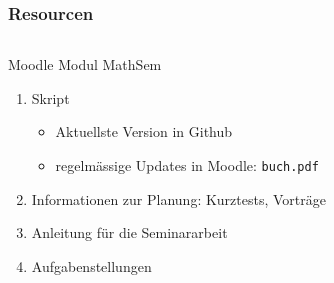 %
%
%
\begin{frame}[t]
\frametitle{Resourcen}
\begin{columns}[t,onlytextwidth]
\begin{column}{0.48\textwidth}
\begin{block}{Moodle Modul MathSem}
\begin{enumerate}
\item<2-> Skript
\begin{itemize}
\item<3-> Aktuellste Version in Github
\item<4-> regelmässige Updates in Moodle: \texttt{buch.pdf}
\end{itemize}
\item<5-> Informationen zur Planung: Kurztests, Vorträge
\item<6-> Anleitung für die Seminararbeit
\item<7-> Aufgabenstellungen
\end{enumerate}
\end{block}
\end{column}
\begin{column}{0.48\textwidth}
\end{column}
\end{columns}
\end{frame}
